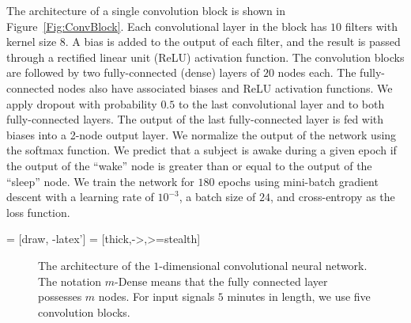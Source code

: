 \documentclass[10pt,a4paper,english]{amsart}
\begin{document}
The architecture of a single convolution block is shown in Figure~\ref{Fig:ConvBlock}. Each convolutional layer in the block has $10$ filters with kernel size $8$.  A bias is added to the output of each filter, and the result is passed through a rectified linear unit (ReLU) activation function. The convolution blocks are followed by two fully-connected (dense) layers of $20$ nodes each. The fully-connected nodes also have associated biases and ReLU activation functions. We apply dropout with probability $0.5$ to the last convolutional layer and to both fully-connected layers. The output of the last fully-connected layer is fed with biases into a 2-node output layer.  We normalize the output of the network using the softmax function. We predict that a subject is awake during a given epoch if the output of the ``wake'' node is greater than or equal to the output of the ``sleep'' node. We train the network for $180$ epochs using mini-batch gradient descent with a learning rate of $10^{-3}$, a batch size of $24$, and cross-entropy as the loss function.


 = [draw, -latex']
 = [thick,->,>=stealth]

\begin{figure}
\centering
    \caption{\label{Fig:Network}The architecture of the $1$-dimensional convolutional neural network.  The notation $m$-Dense means that the fully connected layer possesses $m$ nodes.  For input signals $5$ minutes in length, we use five convolution blocks.}
\end{figure}
\end{document}
